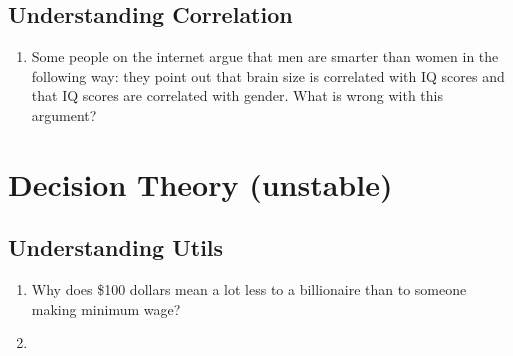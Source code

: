\documentclass[11pt, letterpaper]{article}
\begin{document}
\subsection{Understanding Correlation}
\begin{enumerate}
 \item Some people on the internet argue that men are smarter than women in the following way: they point out that brain size is correlated with IQ scores and that IQ scores are correlated with gender. What is wrong with this argument?
 \end{enumerate}
\newpage

\section{Decision Theory (unstable) }


\subsection{Understanding Utils}
\begin{enumerate}
	\item Why does \$100 dollars mean a lot less to a billionaire than to someone making minimum wage?
	\item 
\end{enumerate}
\newpage
\end{document}
